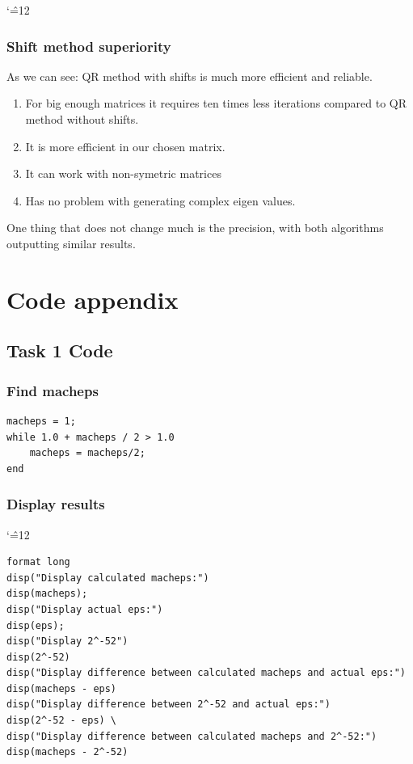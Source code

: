 \documentclass[12pt]{report}
\newenvironment{simplechar}{%
   \catcode`\^=12
}{}
\begin{document}
\begin{simplechar}
\subsection{Shift method superiority}
As we can see:
QR method with shifts is much more efficient and reliable.
\begin{enumerate}
\item For big enough matrices it requires ten times less iterations compared to QR method without shifts.
\item It is more efficient in our chosen matrix.
\item It can work with non-symetric matrices
\item Has no problem with generating complex eigen values.
\end{enumerate}
 One thing that does not change much is the precision, with both algorithms outputting similar results.






\chapter{Code appendix}

\section{Task 1 Code}
\hypertarget{function1_macheps}{\subsection{Find macheps}}
\begin{lstlisting}
macheps = 1;
while 1.0 + macheps / 2 > 1.0
    macheps = macheps/2;
end
\end{lstlisting}

\hypertarget{function1_display}{\subsection{Display results}}
\begin{simplechar}
\begin{lstlisting}
format long
disp("Display calculated macheps:")
disp(macheps);
disp("Display actual eps:")
disp(eps);
disp("Display 2^-52")
disp(2^-52)
disp("Display difference between calculated macheps and actual eps:")
disp(macheps - eps)
disp("Display difference between 2^-52 and actual eps:")
disp(2^-52 - eps) \
disp("Display difference between calculated macheps and 2^-52:")
disp(macheps - 2^-52)
\end{lstlisting}
\end{simplechar}

\end{simplechar}
\end{document}
